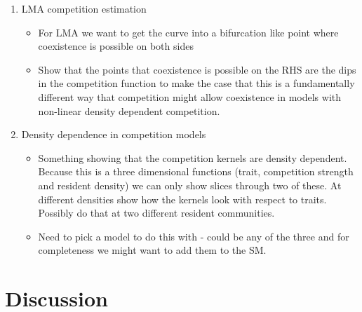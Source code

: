 \documentclass[a4paper,11pt]{article}
\begin{document}
\begin{enumerate}
\item LMA competition estimation
  \begin{itemize}
  \item For LMA we want to get the curve into a bifurcation like point
    where coexistence is possible on both sides
  \item Show that the points that coexistence is possible on the RHS
    are the dips in the competition function to make the case that
    this is a fundamentally different way that competition might allow
    coexistence in models with non-linear density dependent
    competition.
  \end{itemize}
\item Density dependence in competition models
  \begin{itemize}
  \item Something showing that the competition kernels are density
    dependent.  Because this is a three dimensional functions (trait,
    competition strength and resident density) we can only show slices
    through two of these.  At different densities show how the
    kernels look with respect to traits.  Possibly do that at two
    different resident communities.
  \item Need to pick a model to do this with - could be any of the
    three and for completeness we might want to add them to the SM.
  \end{itemize}
\end{enumerate}

\clearpage
\section{Discussion}
\end{document}
